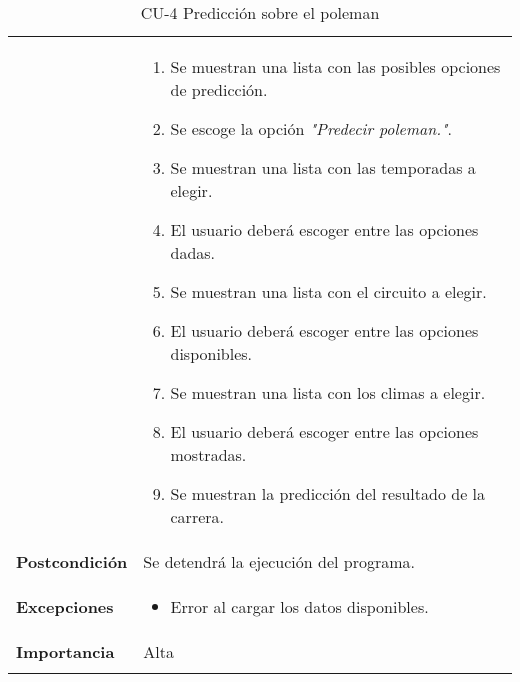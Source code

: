 \begin{longtable}[h!]{@{}ll@{}}
\begin{minipage}[t]{0.23\columnwidth}
\end{minipage} & \begin{minipage}[t]{0.71\columnwidth}\raggedright\strut
\begin{enumerate}
\def\labelenumi{\arabic{enumi}.}
\tightlist
\item
  Se muestran una lista con las posibles opciones de predicción.
\item
  Se escoge la opción \textit{"Predecir poleman."}.
\item
  Se muestran una lista con las temporadas a elegir.
\item
  El usuario deberá escoger entre las opciones dadas.
\item
  Se muestran una lista con el circuito a elegir.
\item
  El usuario deberá escoger entre las opciones disponibles.
\item
  Se muestran una lista con los climas a elegir.
\item
  El usuario deberá escoger entre las opciones mostradas.
\item
  Se muestran la predicción del resultado de la carrera.
\end{enumerate}\strut
\end{minipage}\tabularnewline
\begin{minipage}[t]{0.23\columnwidth}\raggedright\strut
\textbf{Postcondición}\strut
\end{minipage} & \begin{minipage}[t]{0.71\columnwidth}\raggedright\strut
Se detendrá la ejecución del programa.\strut
\end{minipage}\tabularnewline
\begin{minipage}[t]{0.23\columnwidth}\raggedright\strut
\textbf{Excepciones}\strut
\end{minipage} & \begin{minipage}[t]{0.71\columnwidth}\raggedright\strut
\begin{itemize}
\tightlist
\item
  Error al cargar los datos disponibles.
\end{itemize}\strut
\end{minipage}\tabularnewline
\begin{minipage}[t]{0.23\columnwidth}\raggedright\strut
\textbf{Importancia}\strut
\end{minipage} & \begin{minipage}[t]{0.71\columnwidth}\raggedright\strut
Alta\strut
\end{minipage}\tabularnewline
\bottomrule
\caption{CU-4 Predicción sobre el poleman}
\end{longtable}

